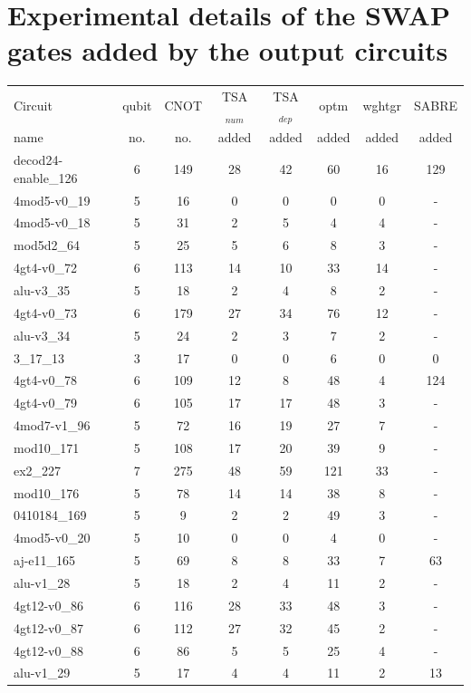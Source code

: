 \documentclass[runningheads]{llncs}
\begin{document}
\section{Experimental details of the SWAP gates added by the output circuits}
\begin{table}[!ht]
	\begin{center}  
	\begin{tabular}{|p{4.3cm}<{\centering}|c|c|c|c|c|c|c|}
	\hline
	Circuit &  qubit  & CNOT &TSA$_{num}$& TSA$_{dep}$  & optm 	 & wghtgr  &SABRE 	\\
	 name	&   no. 	&	no. & added&  added &  added 	&  added&  added\\
	\hline
	decod24-enable\_126 & 6 & 149 & 28 & 42 & 60 & 16 &129\\ 
4mod5-v0\_19 & 5 & 16 & 0 & 0 & 0 & 0&- \\ 
4mod5-v0\_18 & 5 & 31 & 2 & 5 & 4 & 4 &-\\ 
mod5d2\_64 & 5 & 25 & 5 & 6 & 8 & 3&- \\ 
4gt4-v0\_72 & 6 & 113 & 14 & 10 & 33 & 14&- \\ 
alu-v3\_35 & 5 & 18 & 2 & 4 & 8 & 2 &-\\ 
4gt4-v0\_73 & 6 & 179 & 27 & 34 & 76 & 12&- \\ 
alu-v3\_34 & 5 & 24 & 2 & 3 & 7 & 2& - 	\\
3\_17\_13 & 3 & 17 & 0 & 0 & 6 & 0& 0 	\\
4gt4-v0\_78 & 6 & 109 & 12 & 8 & 48 & 4& 124 	\\
4gt4-v0\_79 & 6 & 105 & 17 & 17 & 48 & 3& - 	\\
4mod7-v1\_96 & 5 & 72 & 16 & 19 & 27 & 7& - 	\\
mod10\_171 & 5 & 108 & 17 & 20 & 39 & 9& - 	\\
ex2\_227 & 7 & 275 & 48 & 59 & 121 & 33& - 	\\
mod10\_176 & 5 & 78 & 14 & 14 & 38 & 8& - 	\\
0410184\_169 & 5 & 9 & 2 & 2 & 49 & 3& - 	\\
4mod5-v0\_20 & 5 & 10 & 0 & 0 & 4 & 0& - 	\\
aj-e11\_165 & 5 & 69 & 8 & 8 & 33 & 7& 63 	\\
alu-v1\_28 & 5 & 18 & 2 & 4 & 11 & 2& - 	\\
4gt12-v0\_86 & 6 & 116 & 28 & 33 & 48 & 3& - 	\\
4gt12-v0\_87 & 6 & 112 & 27 & 32 & 45 & 2& - 	\\
4gt12-v0\_88 & 6 & 86 & 5 & 5 & 25 & 4& - 	\\
alu-v1\_29 & 5 & 17 & 4 & 4 & 11 & 2& 13 	\\

\end{tabular}
\end{center}
\end{table}
\end{document}
